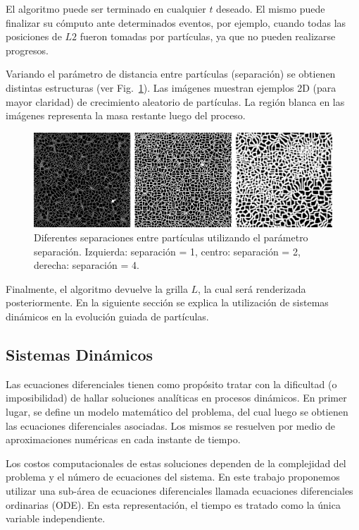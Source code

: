 \documentclass[spanish,a4paper,openright,11pt]{book}
\begin{document}
El algoritmo puede ser terminado en cualquier $t$ deseado. El mismo puede finalizar su c\'omputo ante determinados eventos, por ejemplo, cuando todas las posiciones de $L2$ fueron tomadas por part\'iculas, ya que no pueden realizarse progresos.

Variando el par\'ametro de distancia entre part\'iculas (separación) se obtienen distintas estructuras (ver Fig.~\ref{fg:sistdin1}). Las im\'agenes muestran ejemplos 2D (para mayor claridad) de crecimiento aleatorio de part\'iculas. La regi\'on blanca en las im\'agenes representa la masa restante luego del proceso.


\begin{figure}[htb!]
  \centerline{\includegraphics[scale=0.22]{sistdin1}}
  \caption{Diferentes separaciones entre part\'iculas utilizando el par\'ametro separación. Izquierda: separaci\'on = 1, centro: separaci\'on = 2, derecha: separaci\'on = 4.}
  \label{fg:sistdin1}
\end{figure}

Finalmente, el algoritmo devuelve la grilla $L$, la cual ser\'a renderizada posteriormente. En la siguiente secci\'on se explica la utilizaci\'on de sistemas din\'amicos en la evoluci\'on guiada de part\'iculas.

\subsection{Sistemas Din\'amicos}

Las ecuaciones diferenciales tienen como prop\'osito tratar con la dificultad (o imposibilidad) de hallar soluciones anal\'iticas en procesos din\'amicos. En primer lugar, se define un modelo matem\'atico del problema, del cual luego se obtienen 
las ecuaciones diferenciales asociadas. Los mismos se resuelven por medio de aproximaciones num\'ericas en cada instante de tiempo.

Los costos computacionales de estas soluciones dependen de la complejidad del problema y el n\'umero de ecuaciones del sistema. En este trabajo proponemos utilizar una sub-\'area de ecuaciones diferenciales llamada ecuaciones diferenciales ordinarias (ODE). En esta representaci\'on, el tiempo es tratado como la \'unica variable independiente.
\end{document}
